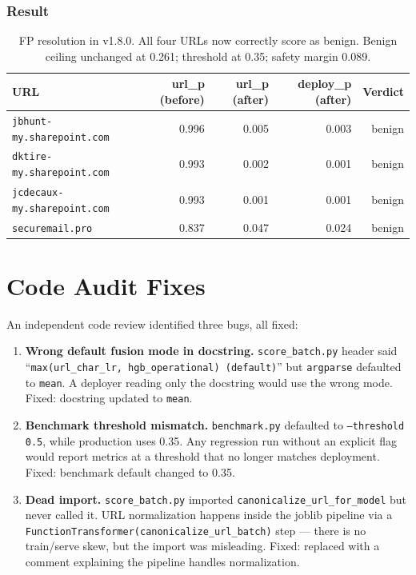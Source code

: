 \documentclass[11pt,a4paper]{article}
\newcommand{\code}[1]{\texttt{#1}}
\begin{document}
\subsubsection*{Result}

\begin{table}[h]
\centering
\begin{tabular}{lrrrr}
\toprule
URL & url\_p (before) & url\_p (after) & deploy\_p (after) & Verdict \\
\midrule
\code{jbhunt-my.sharepoint.com} & 0.996 & 0.005 & 0.003 & benign \\
\code{dktire-my.sharepoint.com} & 0.993 & 0.002 & 0.001 & benign \\
\code{jcdecaux-my.sharepoint.com} & 0.993 & 0.001 & 0.001 & benign \\
\code{securemail.pro} & 0.837 & 0.047 & 0.024 & benign \\
\bottomrule
\end{tabular}
\caption{FP resolution in v1.8.0. All four URLs now correctly score
  as benign. Benign ceiling unchanged at 0.261; threshold at 0.35;
  safety margin 0.089.}
\end{table}

\section{Code Audit Fixes}

An independent code review identified three bugs, all fixed:

\begin{enumerate}
  \item \textbf{Wrong default fusion mode in docstring.}
        \code{score\_batch.py} header said
        ``\texttt{max(url\_char\_lr, hgb\_operational) (default)}''
        but \code{argparse} defaulted to \code{mean}. A deployer
        reading only the docstring would use the wrong mode.
        Fixed: docstring updated to \code{mean}.

  \item \textbf{Benchmark threshold mismatch.}
        \code{benchmark.py} defaulted to \code{--threshold 0.5},
        while production uses 0.35. Any regression run without an
        explicit flag would report metrics at a threshold that no
        longer matches deployment. Fixed: benchmark default changed
        to 0.35.

  \item \textbf{Dead import.}
        \code{score\_batch.py} imported
        \code{canonicalize\_url\_for\_model} but never called it.
        URL normalization happens inside the joblib pipeline via a
        \code{FunctionTransformer(canonicalize\_url\_batch)} step ---
        there is no train/serve skew, but the import was misleading.
        Fixed: replaced with a comment explaining the pipeline
        handles normalization.
\end{enumerate}
\end{document}
